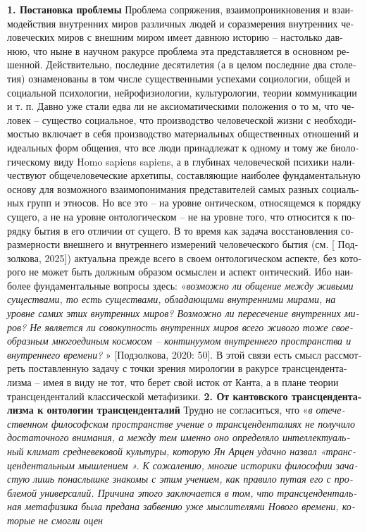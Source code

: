 \begin{russian}
{    \textbf{1. Постановка проблемы}
    Проблема сопряжения, взаимопроникновения и взаимодействия внутренних миров различных людей и соразмерения внутренних человеческих миров с внешним миром имеет давнюю историю – настолько давнюю, что ныне в научном ракурсе проблема эта представляется в основном решенной. 
    Действительно, последние десятилетия (а в целом последние два столетия) ознаменованы в том числе существенными успехами социологии, общей и социальной психологии, нейрофизиологии, культурологии, теории коммуникации и т. п. Давно уже стали едва ли не аксиоматическими положения о то
    м, что человек – существо социальное, что производство человеческой жизни с необходимостью включает в себя производство материальных общественных отношений и идеальных форм общения, что все люди принадлежат к одному и тому же биологическому виду Homo sapiens sapiens, а в глубинах 
    человеческой психики наличествуют общечеловеческие архетипы, составляющие наиболее фундаментальную основу для возможного взаимопонимания представителей самых разных социальных групп и этносов. 
    Но все это – на уровне онтическом, относящемся к порядку сущего, а не на уровне онтологическом – не на уровне того, что относится к порядку бытия в его отличии от сущего. В то время как задача восстановления соразмерности внешнего и внутреннего измерений человеческого бытия (см. [
    Подзолкова, 2025]) актуальна прежде всего в своем онтологическом аспекте, без которого не может быть должным образом осмыслен и аспект онтический. Ибо наиболее фундаментальные вопросы здесь: «\textit{возможно ли общение между живыми существами, то есть существами, обладающими внутренними мирами, на уровне самих этих внутренних миров? Возможно ли пересечение внутренних миров? Не является ли совокупность внутренних миров всего живого тоже своеобразным многоединым космосом – континуумом внутреннего пространства и внутреннего времени?}
    » [Подзолкова, 2020: 50].
     В этой связи есть смысл рассмотреть поставленную задачу с точки зрения мирологии в ракурсе трансцендентализма – имея в виду не тот, что берет свой исток от Канта, а в плане теории трансценденталий классической метафизики.
    \textbf{2. От кантовского трансцендентализма к онтологии трансценденталий}
    Трудно не согласиться, что «\textit{в отечественном философском пространстве учение о трансценденталиях не получило достаточного внимания, а между тем именно оно определяло интеллектуальный климат средневековой культуры, которую Ян Арцен удачно назвал «трансцендентальным мышлением
    ». К сожалению, многие историки философии зачастую лишь понаслышке знакомы с этим учением, как правило путая его с проблемой универсалий. Причина этого заключается в том, что трансцендентальная метафизика была предана забвению уже мыслителями Нового времени, которые не смогли оцен
}}
\end{russian}
